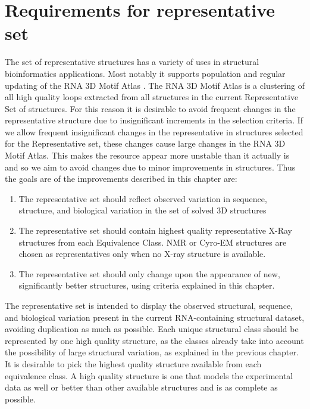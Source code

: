 \section{Requirements for representative set}

The set of representative structures has a variety of uses in structural
bioinformatics applications. Most notably it supports population and regular
updating of the RNA 3D Motif Atlas \cite{http://rna.bgsu.edu/rna3dhub/motifs}.
The RNA 3D Motif Atlas is a clustering of all high quality loops extracted from
all structures in the current Representative Set of structures. For this reason
it is desirable to avoid frequent changes in the representative structure due to
insignificant increments in the selection criteria. If we allow frequent
insignificant changes in the representative in structures selected for the
Representative set, these changes cause large changes in the RNA 3D Motif Atlas.
This makes the resource appear more unstable than it actually is and so we aim
to avoid changes due to minor improvements in structures. Thus the goals are of
the improvements described in this chapter are:

\begin{enumerate}
  \item The representative set should reflect observed variation in sequence,
    structure, and biological variation in the set of solved 3D structures

  \item The representative set should contain highest quality representative
    X-Ray structures from each Equivalence Class. NMR or Cyro-EM structures are
    chosen as representatives only when no X-ray structure is available.

  \item The representative set should only change upon the appearance of new,
    significantly better structures, using criteria explained in this chapter.
\end{enumerate}

The representative set is intended to display the observed structural, sequence,
and biological variation present in the current RNA-containing structural
dataset, avoiding duplication as much as possible. Each unique structural class
should be represented by one high quality structure, as the classes already take
into account the possibility of large structural variation, as explained in the
previous chapter. It is desirable to pick the highest quality structure
available from each equivalence class. A high quality structure is one that
models the experimental data as well or better than other available structures
and is as complete as possible.

